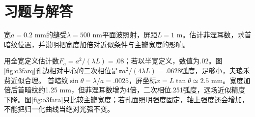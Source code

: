\section{习题与解答}



\begin{exercise}\label{ex:o3farfield}
宽$a=0.2$ mm的缝受$\lambda=500$ nm平面波照射，屏距$L=1$ m。估计菲涅耳数，求首暗纹位置，并说明把宽度加倍对近似条件与主瓣宽度的影响。
\end{exercise}
\begin{solution}
用全宽定义估计数$F_a=a^2/(\lambda L)=.08$；若以半宽定义，数值为.02。图\ref{fig:o3farq}孔边相对中心的二次相位是$\pi a^2/(4\lambda L)=.0628$弧度，足够小，夫琅禾费近似合理。
首暗纹$\sin\theta=\lambda/a=.0025$，屏坐标$x=L\tan\theta\simeq2.5$ mm。宽度加倍后首暗纹约1.25 mm，但菲涅耳数增为4倍，二次相位.251弧度，远场近似精度下降。图\ref{fig:o3fara}只比较主瓣宽度；若孔面照明强度固定，轴上强度还会增加，不能把归一化曲线当绝对光强不变。
\end{solution}


